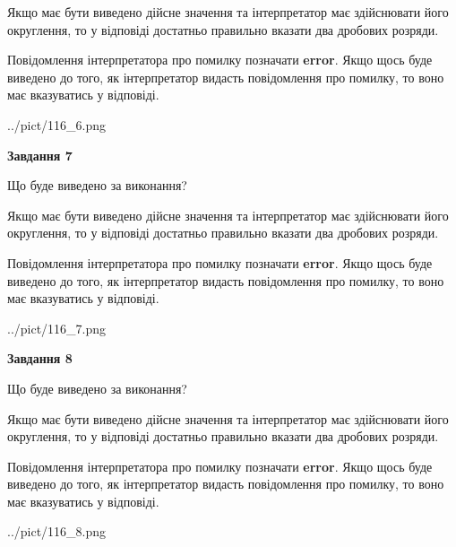 \documentclass[12pt, ukrainian]{article}
\begin{document}
{\begin {Large}
Якщо має бути виведено дійсне значення та інтерпретатор має здійснювати його округлення, 
то у відповіді достатньо правильно вказати два дробових розряди.

Повідомлення інтерпретатора про помилку позначати \textbf{error}.
Якщо щось буде виведено до того, як інтерпретатор видасть повідомлення про помилку, 
то воно має вказуватись у відповіді. \par

\begin{center}
	{../pict/116_6.png}
\end{center}
\newpage

{\begin {center}\textbf{Завдання 7}\end {center}}\par
Що буде виведено за виконання? \par

Якщо має бути виведено дійсне значення та інтерпретатор має здійснювати його округлення, 
то у відповіді достатньо правильно вказати два дробових розряди.

Повідомлення інтерпретатора про помилку позначати \textbf{error}.
Якщо щось буде виведено до того, як інтерпретатор видасть повідомлення про помилку, 
то воно має вказуватись у відповіді. \par

\begin{center}
	{../pict/116_7.png}
\end{center}
\newpage

{\begin {center}\textbf{Завдання 8}\end {center}}\par
Що буде виведено за виконання? \par

Якщо має бути виведено дійсне значення та інтерпретатор має здійснювати його округлення, 
то у відповіді достатньо правильно вказати два дробових розряди.

Повідомлення інтерпретатора про помилку позначати \textbf{error}.
Якщо щось буде виведено до того, як інтерпретатор видасть повідомлення про помилку, 
то воно має вказуватись у відповіді. \par

\begin{center}
	{../pict/116_8.png}
\end{center}
\newpage


\end{Large}}
\end{document}
